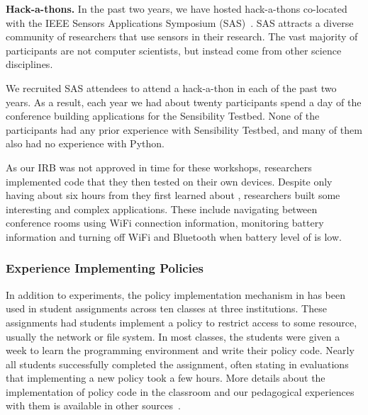 {\bf Hack-a-thons.}  In the past two years, we have hosted 
hack-a-thons co-located with 
the IEEE Sensors Applications Symposium (SAS)~\cite{sas}.  SAS attracts a 
diverse community of researchers that use sensors in their research.
The vast majority of participants are not computer scientists, but instead
come from other science disciplines.

We recruited SAS attendees to attend a hack-a-thon in each of the past two
years.  As a result, each year we had about twenty participants
spend a day of the conference building applications for the Sensibility Testbed.
None of the participants had any prior experience with 
Sensibility Testbed, and many of them also had no experience with Python.

As our IRB was not approved in time for these workshops, 
researchers implemented code that they then tested on their own devices.
%
Despite only having about six hours from they first learned about \sysname, 
researchers built some interesting and complex applications. These include 
navigating between conference rooms using WiFi connection information, 
monitoring battery information and turning off WiFi and Bluetooth when 
battery level of is low.



\subsubsection{Experience Implementing Policies}\label{sec-implementing-policies}

In addition to experiments, 
the policy implementation mechanism in \sysname has 
been used in student assignments across ten classes at three institutions.
These assignments had students implement a policy to restrict access to 
some resource, usually the network or file system.  
%
In most classes, the students were given a week to learn the programming
environment and write their policy code.  Nearly all students successfully
completed the assignment, often stating in evaluations that implementing a new 
policy took a few hours.   More details about the implementation of policy
code in the classroom and our pedagogical experiences with them is available
in other sources~\cite{Cappos_SIGCSE_2014, Hooshangi_SIGCSE_2015}.






